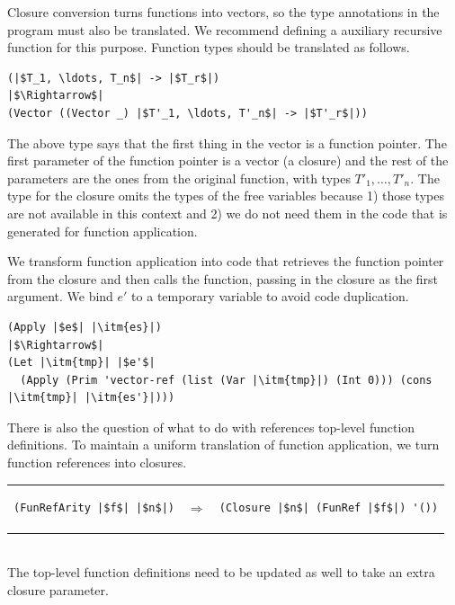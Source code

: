 \documentclass[7x10]{TimesAPriori_MIT}%
\begin{document}
Closure conversion turns functions into vectors, so the type
annotations in the program must also be translated.  We recommend
defining a auxiliary recursive function for this purpose.  Function
types should be translated as follows.
\begin{lstlisting}
(|$T_1, \ldots, T_n$| -> |$T_r$|)
|$\Rightarrow$|  
(Vector ((Vector _) |$T'_1, \ldots, T'_n$| -> |$T'_r$|))
\end{lstlisting}
The above type says that the first thing in the vector is a function
pointer. The first parameter of the function pointer is a vector (a
closure) and the rest of the parameters are the ones from the original
function, with types $T'_1, \ldots, T'_n$.  The  type for
the closure omits the types of the free variables because 1) those
types are not available in this context and 2) we do not need them in
the code that is generated for function application.

We transform function application into code that retrieves the
function pointer from the closure and then calls the function, passing
in the closure as the first argument. We bind $e'$ to a temporary
variable to avoid code duplication.
\begin{lstlisting}
(Apply |$e$| |\itm{es}|)
|$\Rightarrow$|
(Let |\itm{tmp}| |$e'$|
  (Apply (Prim 'vector-ref (list (Var |\itm{tmp}|) (Int 0))) (cons |\itm{tmp}| |\itm{es'}|)))
\end{lstlisting}

There is also the question of what to do with references top-level
function definitions. To maintain a uniform translation of function
application, we turn function references into closures.

\begin{tabular}{lll}
\begin{minipage}{0.3\textwidth}
\begin{lstlisting}
(FunRefArity |$f$| |$n$|)
\end{lstlisting}
\end{minipage}
&
$\Rightarrow$
&
\begin{minipage}{0.5\textwidth}
\begin{lstlisting}
(Closure |$n$| (FunRef |$f$|) '())
\end{lstlisting}
\end{minipage}
\end{tabular}  \\
%
The top-level function definitions need to be updated as well to take
an extra closure parameter.
\end{document}
